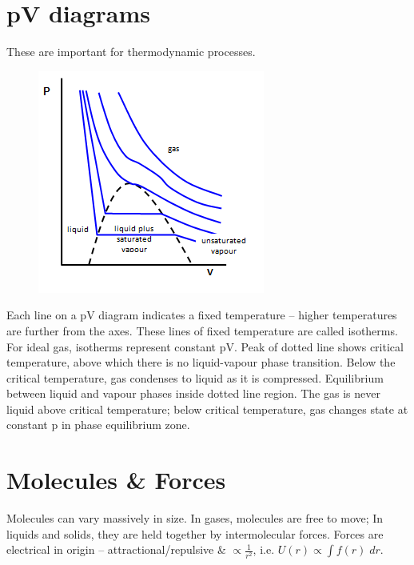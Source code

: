 \documentclass[a4paper, 11pt, normalem]{report}
\begin{document}
\section{pV diagrams}
These are important for thermodynamic processes. 
\begin{figure}[H]
    \centering
    \includegraphics{pV.png} 
\end{figure}
Each line on a pV diagram indicates a fixed temperature -- higher temperatures are further from the axes. 
These lines of fixed temperature are called isotherms.
For ideal gas, isotherms represent constant pV.
Peak of dotted line shows critical temperature, above which there is no liquid-vapour phase transition.
Below the critical temperature, gas condenses to liquid as it is compressed.
Equilibrium between liquid and vapour phases inside dotted line region.
The gas is never liquid above critical temperature; below critical temperature, gas changes state at constant p in phase equilibrium zone.

\section{Molecules \& Forces}
Molecules can vary massively in size.
In gases, molecules are free to move; In liquids and solids, they are held together by intermolecular forces.
Forces are electrical in origin -- attractional/repulsive \& $\propto \frac{1}{r^{2}}$, i.e. $U(r)\propto\int\! f(r)\; dr$.
\end{document}
